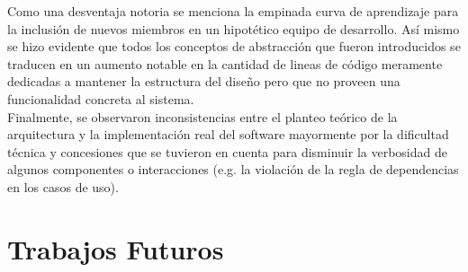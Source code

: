 Como una desventaja notoria se menciona la empinada curva de aprendizaje para la inclusión de nuevos miembros en un hipotético equipo de desarrollo. Así mismo se hizo evidente que todos los conceptos de abstracción que fueron introducidos se traducen en un aumento notable en la cantidad de lineas de código meramente dedicadas a mantener la estructura del diseño pero que no proveen una funcionalidad concreta al sistema.\\
Finalmente, se observaron inconsistencias entre el planteo teórico de la arquitectura y la implementación real del software mayormente por la dificultad técnica y concesiones que se tuvieron en cuenta para disminuir la verbosidad de algunos componentes o interacciones (e.g. la violación de la regla de dependencias en los casos de uso).
\section{Trabajos Futuros}